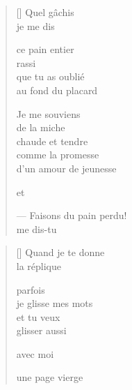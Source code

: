 \documentclass[12pt,a4paper]{article}
\begin{document}

\newpage

\poemtitle{}

\settowidth{\versewidth}{--- Faisons du pain perdu!}

\bigskip

\begin{verse}[\versewidth]
  Quel gâchis \\
  je me dis

  ce pain entier \\
  rassi \\
  que tu as oublié \\
  au fond du placard

  Je me souviens \\
  de la miche \\
  chaude et tendre \\
  comme la promesse \\
  d'un amour de jeunesse

  et

  --- Faisons du pain perdu! \\
  me dis-tu
\end{verse}


\newpage

\poemtitle{}

\settowidth{\versewidth}{je glisse mes mots}

\bigskip

\begin{verse}[\versewidth]
  Quand je te donne \\
  la réplique

  parfois \\
  je glisse mes mots \\
  et tu veux \\
  glisser aussi

  avec moi

  une page vierge
\end{verse}


\newpage

\poemtitle{}

\settowidth{\versewidth}{d'une lumière chaude}

\bigskip
\end{document}
